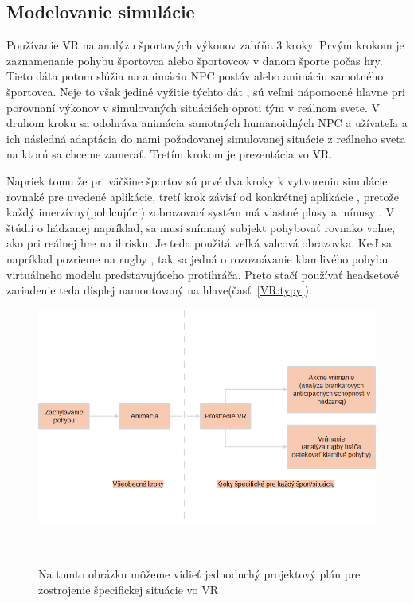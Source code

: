 \documentclass[10pt,twoside,slovak,a4paper]{article}										%
\begin{document}
\subsection{Modelovanie simulácie} \label{SW:model}
Používanie VR na analýzu športových výkonov zahŕňa 3 kroky. Prvým krokom je zaznamenanie pohybu športovca alebo športovcov v danom športe počas hry. Tieto dáta potom slúžia na animáciu NPC postáv alebo animáciu samotného športovca. Neje to však jediné vyžitie týchto dát , sú veľmi nápomocné hlavne pri porovnaní výkonov v simulovaných situáciách oproti tým v reálnom svete. V druhom kroku sa odohráva animácia samotných humanoidných NPC a užívateľa a ich následná adaptácia do nami požadovanej simulovanej situácie z reálneho sveta na ktorú sa chceme zamerať. Tretím krokom je prezentácia vo VR.

Napriek tomu že pri väčšine športov sú prvé dva kroky k vytvoreniu simulácie rovnaké pre uvedené aplikácie, tretí krok závisí od konkrétnej aplikácie , pretože každý imerzívny(pohlcujúci) zobrazovací systém má vlastné plusy a mínusy . V štúdií o hádzanej napríklad, sa musí snímaný subjekt pohybovať rovnako voľne, ako pri reálnej hre na ihrisku. Je teda použitá veľká valcová obrazovka. Keď sa napríklad pozrieme na rugby , tak sa jedná o rozoznávanie klamlivého pohybu virtuálneho modelu predstavujúceho protihráča. Preto stačí používať headsetové zariadenie teda displej namontovaný na hlave(časť~\ref{VR:typy}). ~\cite{Hlavny:zdroj}
\clearpage
\begin{figure}[htbp]
\centering
\includegraphics[scale=0.4]{model.png}
\caption{Na tomto obrázku môžeme vidieť jednoduchý projektový plán pre zostrojenie špecifickej situácie vo VR}  ~\cite{Hlavny:zdroj}
\label{fig}
\end{figure}
\end{document}

